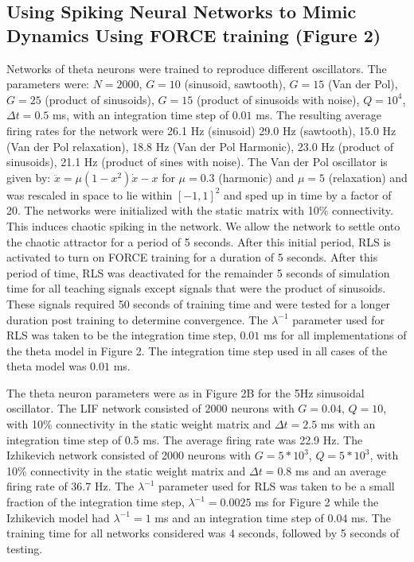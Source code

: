 \documentclass[11pt]{article} %
\begin{document}
\subsection*{Using Spiking Neural Networks to Mimic Dynamics Using FORCE training (Figure 2)} 

Networks of theta neurons were trained to reproduce different oscillators.  
The parameters were: $N=2000$, $G=10$ (sinusoid, sawtooth), $G = 15$ (Van der Pol), 
$G=25$ (product of sinusoids), $G=15$ (product of sinusoids with noise), $Q = 10^4$, 
$\Delta t = 0.5$ ms, with an integration time step of $0.01$ ms.   
The resulting average firing rates for the network were 26.1 Hz (sinusoid) 29.0 Hz (sawtooth), 
15.0 Hz (Van der Pol relaxation), 18.8 Hz (Van der Pol Harmonic), 23.0 Hz (product of sinusoids), 
21.1 Hz (product of sines with noise). The Van der Pol oscillator is given by: 
$\ddot{x}  = \mu(1-x^2)\dot{x} - x$ for $\mu = 0.3$ (harmonic) and $\mu = 5$ (relaxation)  
and was rescaled in space to lie within $[-1,1]^2$  and sped up in time by a factor of 20.    
The networks were initialized with the static matrix with 10\% connectivity.  
This induces chaotic spiking in the network.  We allow the network to settle onto the 
chaotic attractor for a period of 5 seconds.  After this initial period,  
RLS is activated to turn on FORCE training for a duration of 5 seconds.  
After this period of time, RLS was deactivated for the remainder 5 seconds of simulation time 
for all teaching signals except signals that were the product of sinusoids.  
These signals required 50 seconds of training time and were tested for a longer duration 
post training to determine convergence.   The $\lambda^{-1}$ parameter used for RLS 
was taken to be the integration time step, $0.01$ ms for all implementations of 
the theta model in Figure 2.  The integration time step used in all cases of the 
theta model was $0.01$ ms.  

The theta neuron parameters were as in Figure 2B for the 5Hz sinusoidal oscillator.  
The LIF network consisted of 2000 neurons with $G=0.04$, $Q = 10$, with 10\% 
connectivity in the static weight matrix and $\Delta t = 2.5$ ms with an integration 
time step of 0.5 ms.  The average firing rate was 22.9 Hz.   
The Izhikevich network consisted of 2000 neurons with $G =5*10^3 $, $Q = 5*10^3$, 
with 10\% connectivity in the static weight matrix and $\Delta t =  0.8 $ ms 
and an average firing rate of 36.7 Hz.  The $\lambda^{-1}$ parameter used for RLS 
was taken to be a small fraction of the integration time step, $\lambda^{-1} = 0.0025$ 
ms for Figure 2 while the Izhikevich model had $\lambda^{-1} = 1$ ms and 
an integration time step of $0.04$ ms.    The training time for all networks 
considered was 4 seconds, followed by 5 seconds of testing.  
\end{document}
